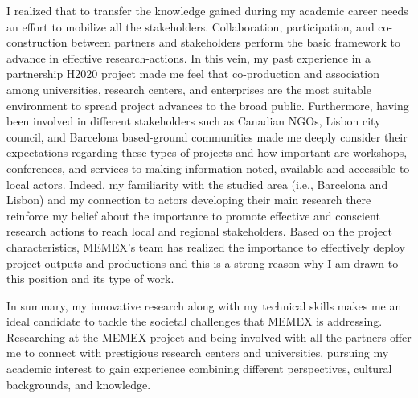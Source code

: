 \begin{comment}


My expertise in Geographic Information Science (GIScience), planning, and social theory allow me to teach courses in digital geographies, qualitative and quantitative methods, and GIS, as well as fundamentals in programming language such as SQL and Python. Mixing methods and making associations between cutting-edge tools and theoretical frameworks, my classrooms shift between pragmatic and theoretical perspectives to be able to keep simple and complex overviews needed for the geographical inquiry. Furthermore, I have experience supervising students, helping them to reach their maximum potential by inspiring guiding them through an independent research project.\par

\end{comment}


I realized that to transfer the knowledge gained during my academic career needs an effort to mobilize all the stakeholders. Collaboration, participation, and co-construction between partners and stakeholders perform the basic framework to advance in effective research-actions. In this vein, my past experience in a partnership H2020 project made me feel that co-production and association among universities, research centers, and enterprises are the most suitable environment to spread project advances to the broad public. Furthermore, having been involved in different stakeholders such as Canadian NGOs, Lisbon city council, and Barcelona based-ground communities made me deeply consider their expectations regarding these types of projects and how important are workshops, conferences, and services to making information noted, available and accessible to local actors. Indeed, my familiarity with the studied area (i.e., Barcelona and Lisbon) and my connection to actors developing their main research there reinforce my belief about the importance to promote effective and conscient research actions to reach local and regional stakeholders. Based on the project characteristics, MEMEX's team has realized the importance to effectively deploy project outputs and productions and this is a strong reason why I am drawn to this position and its type of work.\par


In summary, my innovative research along with my technical skills makes me an ideal candidate to tackle the societal challenges that MEMEX is addressing. Researching at the MEMEX project and being involved with all the partners offer me to connect with prestigious research centers and universities, pursuing my academic interest to gain experience combining different perspectives, cultural backgrounds, and knowledge.\par

